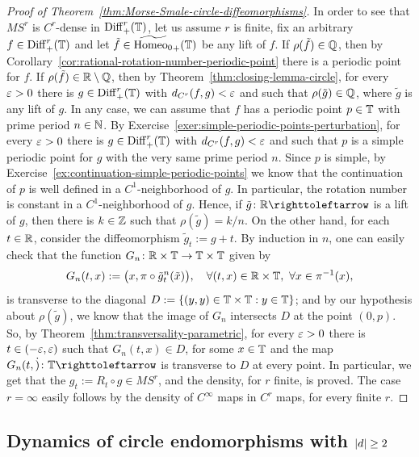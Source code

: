 \begin{proof}[Proof of Theorem~\ref{thm:Morse-Smale-circle-diffeomorphisms}]
  In order to see that $MS^r$ is $C^r$-dense in $\mathrm{Diff}_{+}^{r}(\mathbb{T})$, let us assume $r$ is finite, fix an arbitrary $f\in\mathrm{Diff}_{+}^{r}(\mathbb{T})$ and let $\tilde f\in\widetilde{\mathrm{Homeo}_0}_+(\mathbb{T})$ be any lift of $f$. If $\rho(\tilde f)\in\mathbb{Q}$, then by Corollary~\ref{cor:rational-rotation-number-periodic-point} there is a periodic point for $f$. If $\rho(\tilde f)\in\mathbb{R}\setminus\mathbb{Q}$, then by Theorem~\ref{thm:closing-lemma-circle}, for every $\varepsilon>0$ there is $g\in\mathrm{Diff}_{+}^{r}(\mathbb{T})$ with $d_{C^r}(f,g)<\varepsilon$ and such that $\rho(\tilde g)\in\mathbb{Q}$, where $\tilde g$ is any lift of $g$. In any case, we can assume that $f$ has a periodic point $p\in\mathbb{T}$ with prime period $n\in\mathbb{N}$. By Exercise~\ref{exer:simple-periodic-points-perturbation}, for every $\varepsilon>0$ there is $g\in\mathrm{Diff}_{+}^{r}(\mathbb{T})$ with $d_{C^r}(f,g)<\varepsilon$ and such that $p$ is a simple periodic point for $g$ with the very same prime period $n$. Since $p$ is simple, by Exercise~\ref{ex:continuation-simple-periodic-points} we know that the continuation of $p$ is well defined in a $C^1$-neighborhood of $g$. In particular, the rotation number is constant in a $C^1$-neighborhood of $g$. Hence, if $\tilde g\colon\R\carr$ is a lift of $g$, then there is $k\in\mathbb{Z}$ such that $\rho(\tilde g)=k/n$. On the other hand, for each $t\in\mathbb{R}$, consider the diffeomorphism $\tilde g_t:=g+t$. By induction in $n$, one can easily check that the function $G_n\colon\mathbb{R}\times\mathbb{T}\to\mathbb{T}\times\mathbb{T}$ given by
  \begin{displaymath}
    G_n(t,x):=\big(x,\pi\circ\tilde g_t^n(\tilde x)\big), \quad \forall (t,x)\in\mathbb{R}\times\mathbb{T}, \ \forall x\in\pi^{-1}(x),
  \end{displaymath}
  is transverse to the diagonal $D:=\{(y,y)\in\mathbb{T}\times\mathbb{T} : y\in\mathbb{T}\}$; and by our hypothesis about $\rho(\tilde g)$, we know that the image of $G_n$ intersects $D$ at the point $(0,p)$. So, by Theorem~\ref{thm:transversality-parametric}, for every $\varepsilon>0$ there is $t\in(-\varepsilon,\varepsilon)$ such that $G_n(t,x)\in D$, for some $x\in\mathbb{T}$ and the map $G_n(t,\dot)\colon\T\carr$ is transverse to $D$ at every point. In particular,  we get that the $g_t:=R_t\circ g\in MS^r$, and the density, for $r$ finite, is proved. The case $r=\infty$ easily follows by the density of $C^\infty$ maps in $C^r$ maps, for every finite $r$.
\end{proof}

\subsection{Dynamics of circle endomorphisms with $\left\lvert{d}\right\rvert\geq 2$}
\label{sec:dynam-circle-endomorphisms}

